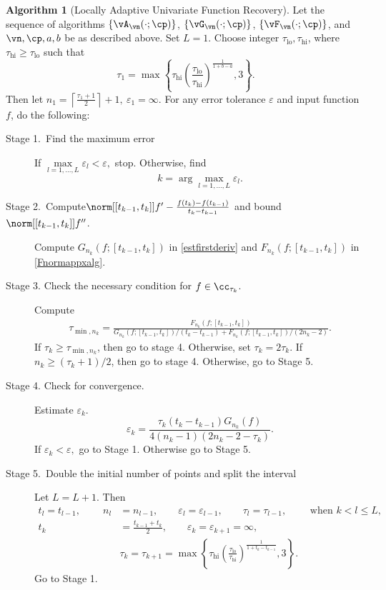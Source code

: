 \documentclass[]{elsarticle}
\DeclareMathOperator{\lo}{lo}
\DeclareMathOperator{\err}{err}
\theoremstyle{definition}
\newtheorem{algo}{Algorithm}
\theoremstyle{remark}
\begin{document}


\begin{algo}[Locally Adaptive Univariate Function Recovery] \label{multistageapproalgo}
Let the sequence of algorithms $\{\vA_{\vn}(\cdot;\cp)\}$, $\{\vG_{\vn}(\cdot;\cp)\}$,  $\{\vF_{\vn}(\cdot;\cp)\}$, and $\vn, \cp, a, b$  be as described above. Set $L=1$.
Choose integer $\tau_{\lo}, \tau_{\text{hi}}$, where $\tau_{\text{hi}} \ge \tau_{\lo}$ such that
$$\tau_1 = \max\left\{  \tau_{\text{hi}} \left(\frac{\tau_{\lo}}{\tau_{\text{hi}}}\right)^{\frac{1}{1+b-a}}  ,3\right\}.$$
Then let $n_1= \left\lceil\frac{\tau_1+1}{2}  \right\rceil+1, \ \varepsilon_1=\infty.$ For any error tolerance $\varepsilon$ and input function $f$, do the following:
\begin{description}
\item[Stage 1.\ Find the maximum error] If $\max\limits_{l=1,\ldots,L}\varepsilon_l < \varepsilon,$ stop.
Otherwise, find
$$k = \arg\max\limits_{l=1,\ldots,L}\varepsilon_l.$$
\item[Stage 2.\ Compute{$\norm[{[t_{k-1},t_k]}]{f'-\frac{f(t_k)-f(t_{k-1})}{t_k-t_{k-1}}}$} and bound {$\norm[{[t_{k-1},t_k]}]{f''}$}.] Compute $G_{n_k}(f;{[t_{k-1},t_k]})$ in \eqref{estfirstderiv} and $F_{n_k}(f;{[t_{k-1},t_k]})$ in \eqref{Fnormappxalg}.
\item[Stage 3. Check the necessary condition for $f \in \cc_{\tau_k}$.] Compute
    \begin{align*}
     \tau_{\min,n_k} =  \frac{F_{n_k}(f;{[t_{k-1},t_k]})}{G_{n_k}(f;{[t_{k-1},t_k]})/(t_k-t_{k-1})+F_{n_k}(f;{[t_{k-1},t_k]})/(2n_k-2)}.
    \end{align*}
If $\tau_k \ge \tau_{\min,n_k}$, then go to stage 4.  Otherwise, set $\tau_k = 2\tau_k$.  If $n_k \ge (\tau_k+1)/2$, then go to stage 4.  Otherwise, go to Stage 5.
\item[Stage 4. Check for convergence.] Estimate $\varepsilon_k.$
$$\varepsilon_k=\frac{\tau_k(t_k-t_{k-1})G_{n_k}(f)}{4(n_k-1)(2n_k-2 - \tau_k)}.$$
If $\varepsilon_k < \varepsilon ,$ go to Stage 1. Otherwise go to Stage 5.
\item[Stage 5.\ Double the initial number of points and split the interval]
Let $L=L+1.$ Then
\begin{align*}
t_l=t_{l-1}, \qquad \ n_l&=n_{l-1}, \qquad \varepsilon_l=\varepsilon_{l-1}, \qquad \tau_l=\tau_{l-1}, \qquad \text{ when } k < l \le L,\\
t_k&=\frac{t_{k-1}+t_k}{2}, \qquad \varepsilon_k=\varepsilon_{k+1}=\infty, \\
&  \tau_k=\tau_{k+1}=\max\left\{ \tau_{\text{hi}} \left(\frac{\tau_{\lo}}{\tau_{\text{hi}}}\right)^{\frac{1}{1+t_k-t_{k-1}}}  ,3\right\}.
\end{align*}
Go to Stage 1.
\end{description}
\end{algo}
\end{document}
